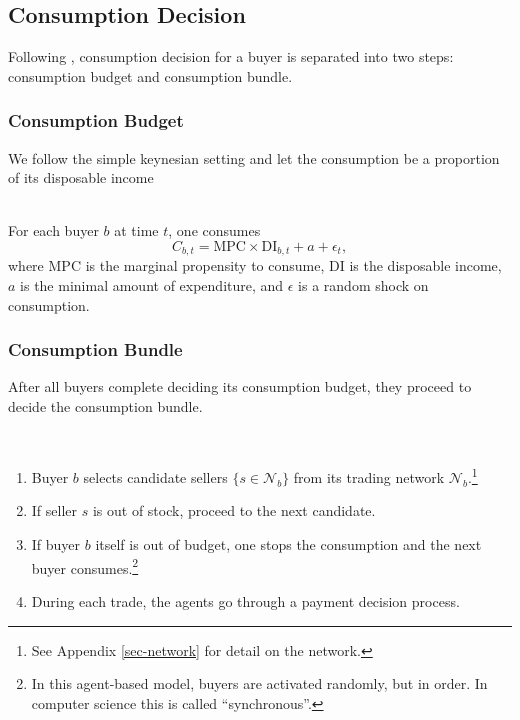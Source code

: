 
\subsection{Consumption Decision}

Following \citet*{HandbookABM}, consumption decision for a buyer is separated into two steps: consumption budget and consumption bundle.

\subsubsection*{Consumption Budget}

We follow the simple keynesian setting and let the consumption be a proportion of its disposable income

\begin{definition}
   {\phantom{text} \\}
   For each buyer $b$ at time $t$, one consumes
   \begin{equation}
      C_{b,t} = \mathrm{MPC}\times \mathrm{DI}_{b,t} + a + \epsilon_t ,
   \end{equation}
   where $\mathrm{MPC}$ is the marginal propensity to consume, $\mathrm{DI}$ is the disposable income, $a$ is the minimal amount of expenditure, and $\epsilon$ is a random shock on consumption.
\end{definition}

\subsubsection*{Consumption Bundle}
After all buyers complete deciding its consumption budget, they proceed to decide the consumption bundle.

\begin{definition}
\phantom{} \\
\begin{enumerate}
   \item Buyer $b$ selects candidate sellers $\{s \in \mathcal{N}_b\}$ from its
   trading network $\mathcal{N}_b$.\footnote{See Appendix \ref{sec-network} for detail on the
   network.}
   \item If seller $s$ is out of stock, proceed to the next candidate.
   \item If buyer $b$ itself is out of budget, one stops the consumption and the next buyer consumes.\footnote{In this agent-based model, buyers are activated randomly, but in order. In computer science this is called ``synchronous''.}
   \item During each trade, the agents go through a payment decision process.
\end{enumerate}
\end{definition}

